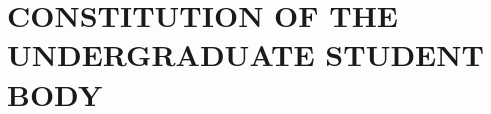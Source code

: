 \documentclass[12pt]{constitution}
\begin{document}
\begin{multicols}{2}
\tableofcontents
\end{multicols}
\endgroup

\newpage


\linenumbers
{}
\setcounter{page}{1}




\part{CONSTITUTION OF THE UNDERGRADUATE STUDENT BODY}






\label{PartA}















\end{document}
